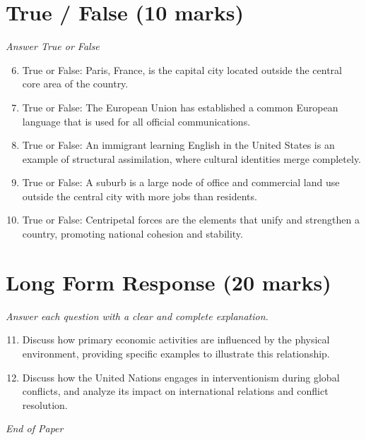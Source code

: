 \documentclass[12pt]{article}
\begin{document}
\section*{True / False (10 marks)}
\textit{Answer True or False}
\begin{enumerate}[label=\arabic*.]
\setcounter{enumi}{5}
\item True or False: Paris, France, is the capital city located outside the central core area of the country.
\item True or False: The European Union has established a common European language that is used for all official communications.
\item True or False: An immigrant learning English in the United States is an example of structural assimilation, where cultural identities merge completely.
\item True or False: A suburb is a large node of office and commercial land use outside the central city with more jobs than residents.
\item True or False: Centripetal forces are the elements that unify and strengthen a country, promoting national cohesion and stability.
\end{enumerate}

\section*{Long Form Response (20 marks)}
\textit{Answer each question with a clear and complete explanation.}
\begin{enumerate}[label=\arabic*.]
\setcounter{enumi}{10}
\item Discuss how primary economic activities are influenced by the physical environment, providing specific examples to illustrate this relationship.
\item Discuss how the United Nations engages in interventionism during global conflicts, and analyze its impact on international relations and conflict resolution.
\end{enumerate}

\vfill
\noindent\textit{End of Paper}
\end{document}
